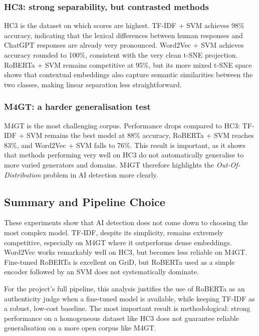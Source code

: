 \documentclass[11pt,a4paper]{article}
\begin{document}
\subsubsection{HC3: strong separability, but contrasted methods}
HC3 is the dataset on which scores are highest. TF-IDF + SVM achieves 98\%
accuracy, indicating that the lexical differences between human responses and
ChatGPT responses are already very pronounced. Word2Vec + SVM achieves accuracy
rounded to 100\%, consistent with the very clean t-SNE projection. RoBERTa +
SVM remains competitive at 95\%, but its more mixed t-SNE space shows that
contextual embeddings also capture semantic similarities between the two
classes, making linear separation less straightforward.

\subsubsection{M4GT: a harder generalisation test}
M4GT is the most challenging corpus. Performance drops compared to HC3:
TF-IDF + SVM remains the best model at 88\% accuracy, RoBERTa + SVM reaches
83\%, and Word2Vec + SVM falls to 76\%. This result is important, as it shows
that methods performing very well on HC3 do not automatically generalise to
more varied generators and domains. M4GT therefore highlights the
\textit{Out-Of-Distribution} problem in AI detection more clearly.

\subsection{Summary and Pipeline Choice}
These experiments show that AI detection does not come down to choosing the
most complex model. TF-IDF, despite its simplicity, remains extremely
competitive, especially on M4GT where it outperforms dense embeddings. Word2Vec
works remarkably well on HC3, but becomes less reliable on M4GT. Fine-tuned
RoBERTa is excellent on GriD, but RoBERTa used as a simple encoder followed
by an SVM does not systematically dominate.

For the project's full pipeline, this analysis justifies the use of RoBERTa
as an authenticity judge when a fine-tuned model is available, while keeping
TF-IDF as a robust, low-cost baseline. The most important result is methodological:
strong performance on a homogeneous dataset like HC3 does not guarantee reliable
generalisation on a more open corpus like M4GT.

\newpage
\end{document}
